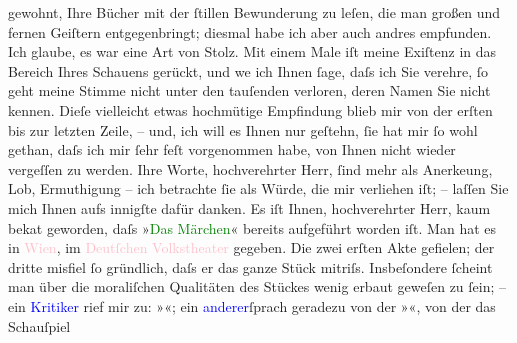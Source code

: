                     gewohnt, Ihre Bücher mit der ſtillen Bewunderung zu leſen, die man großen und
                    fernen Geiſtern entgegen{\pb}bringt; diesmal
                    habe ich aber auch andres empfunden. Ich glaube, es war eine Art von Stolz. Mit
                    einem Male iſt meine Exiſtenz in das Bereich Ihres Schauens gerückt, und we{\geminationn} ich Ihnen ſage, daſs ich Sie verehre, ſo geht
                    meine Stimme nicht unter den tauſenden verloren, deren Namen Sie nicht kennen.
                    Dieſe vielleicht etwas hochmütige Empfindung blieb mir {\pb}von der erſten bis zur letzten Zeile, –
                    und, ich will es Ihnen nur geſtehn, ſie hat mir ſo wohl gethan, daſs ich mir
                    ſehr feſt vorgenommen habe, von Ihnen nicht wieder vergeſſen zu werden. Ihre
                    Worte, hochverehrter Herr, ſind mehr als Anerke{\geminationn}ung, Lob, Ermuthigung – ich betrachte ſie als Würde, die mir verliehen iſt; –
                    laſſen Sie mich Ihnen aufs innigſte dafür {\pb}danken.\pend
           \pstart
           Es iſt Ihnen, hochverehrter Herr, kaum beka{\geminationn}t
                    geworden, daſs »\textcolor{green}{Das Märchen}{}\ledrightnote{\textcolor{green}{Das Märchen. Schauspiel in drei Aufzügen}}« bereits
                    aufgeführt worden iſt. Man hat es in \textcolor{pink}{Wien}{}\ledrightnote{\textcolor{pink}{Wien}}, im
                        \textcolor{pink}{Deutſchen Volkstheater}{}\ledrightnote{\textcolor{pink}{Volkstheater}} gegeben. Die zwei
                    erſten Akte gefielen; der dritte misfiel ſo gründlich, daſs er das ganze Stück
                    mitriſs. Insbeſondere ſcheint man über die moraliſchen Qualitäten des Stückes
                    wenig erbaut geweſen zu ſein; – ein \textcolor{blue}{Kritiker}{} rief mir zu: »\label{K_L00336_1v}\label{K_L00336_1h}«; ein \textcolor{blue}{anderer}{}ſprach geradezu von der »\label{K_L00336_2v}\label{K_L00336_2h}«, von der das Schauſpiel
